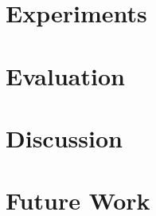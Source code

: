\documentclass[11pt]{article}
\begin{document}
\section{Experiments}
\section{Evaluation}
\section{Discussion}
\section{Future Work}












\end{document}
